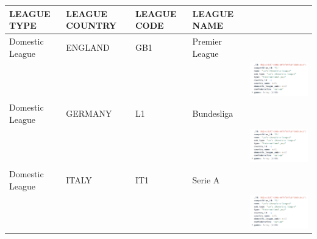 \documentclass{Configuration_Files/PoliMi3i_thesis}
\begin{document}
    \begin{tabular}{|p{3cm}|p{2cm}|p{2cm}|p{2cm}|p{6cm}|}
        \hline
        \textbf{LEAGUE TYPE}          & \textbf{LEAGUE COUNTRY} & \textbf{LEAGUE CODE} & \textbf{LEAGUE NAME} & \\ \hline
    Domestic League                & ENGLAND                & GB1                  & Premier League     & \\
    & & & &\includegraphics[scale=0.7]{Images/Leagues analysed/CL.png}  \\ \hline
    Domestic League                & GERMANY                & L1                   & Bundesliga         & \\
    & & & &\includegraphics[scale=0.7]{Images/Leagues analysed/CL.png}  \\ \hline
    Domestic League                & ITALY                  & IT1                  & Serie A            & \\
    & & & &\includegraphics[scale=0.7]{Images/Leagues analysed/CL.png}  \\ \hline
\end{tabular}
\end{document}
